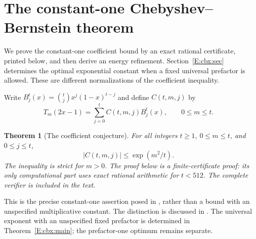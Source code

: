 \documentclass[11pt,a4paper]{article}
\newtheorem{theorem}{Theorem}[section]
\theoremstyle{definition}
\theoremstyle{remark}
\numberwithin{equation}{section}
\begin{document}
\section{The constant-one Chebyshev--Bernstein theorem}
\label{E:cba:sec}

We prove the constant-one coefficient bound by an exact rational
certificate, printed below, and then derive an energy refinement.
Section~\ref{E:cbx:sec} determines the optimal exponential constant when a
fixed universal prefactor is allowed. These are different normalizations
of the coefficient inequality.

Write $B_j^t(x)=\binom tjx^j(1-x)^{t-j}$ and define $C(t,m,j)$ by
\[
 T_m(2x-1)=\sum_{j=0}^t C(t,m,j)B_j^t(x),\qquad 0\le m\le t.
\]

\begin{theorem}[The coefficient conjecture]
\label{E:cba:constantone}
For all integers $t\ge1$, $0\le m\le t$, and $0\le j\le t$,
\begin{equation}\label{E:cba:conjecture}
 |C(t,m,j)|\le \exp(m^2/t).
\end{equation}
The inequality is strict for $m>0$. The proof below is a finite-certificate proof: its only computational part
uses exact rational arithmetic for $t<512$. The complete verifier is
included in the text.
\end{theorem}

This is the precise constant-one assertion posed in
\cite[Supplement, Remark~4.1, equation~(23)]{BT_VKVK2019}, rather than a
bound with an unspecified multiplicative constant. The distinction is discussed in
\cite[Appendix~C.2]{BT_MMRS2025}. The universal exponent with an unspecified
fixed prefactor is determined in
Theorem~\ref{E:cbx:main}; the prefactor-one optimum remains separate.
\end{document}

